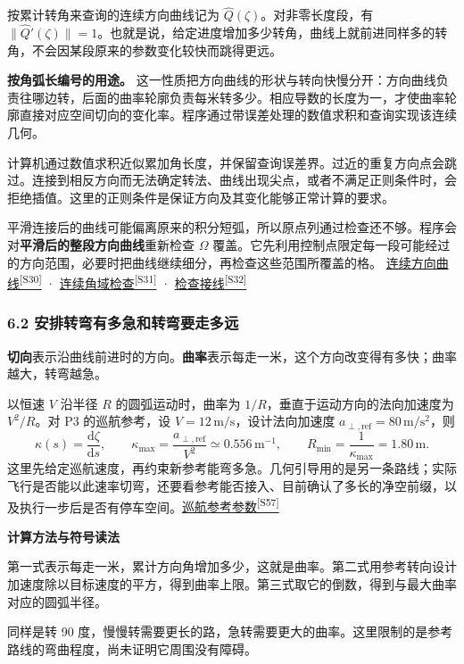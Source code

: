 \documentclass[12pt,a4paper]{article}
\numberwithin{equation}{topic}
\newcommand{\sourceref}[2]{\hyperlink{source-#1}{#2\textsuperscript{[#1]}}}
\begin{document}
按累计转角来查询的连续方向曲线记为 \(\widehat Q(\zeta)\)。对非零长度段，有 \(\|\widehat Q'(\zeta)\|=1\)。也就是说，给定进度增加多少转角，曲线上就前进同样多的转角，不会因某段原来的参数变化较快而跳得更远。

\textbf{按角弧长编号的用途。} 这一性质把方向曲线的形状与转向快慢分开：方向曲线负责往哪边转，后面的曲率轮廓负责每米转多少。相应导数的长度为一，才使曲率轮廓直接对应空间切向的变化率。程序通过带误差处理的数值求积和查询实现该连续几何。

计算机通过数值求积近似累加角长度，并保留查询误差界。过近的重复方向点会跳过。连接到相反方向而无法确定转法、曲线出现尖点，或者不满足正则条件时，会拒绝插值。这里的正则条件是保证方向及其变化能够正常计算的要求。

平滑连接后的曲线可能偏离原来的积分短弧，所以原点列通过检查还不够。程序会对\textbf{平滑后的整段方向曲线}重新检查 \(\Omega\) 覆盖。它先利用控制点限定每一段可能经过的方向范围，必要时把曲线继续细分，再检查这些范围所覆盖的格。 \sourceref{S30}{连续方向曲线} · \sourceref{S31}{连续角域检查} · \sourceref{S32}{检查接线}

\subsubsection*{6.2 安排转弯有多急和转弯要走多远}

\textbf{切向}表示沿曲线前进时的方向。\textbf{曲率}表示每走一米，这个方向改变得有多快；曲率越大，转弯越急。

以恒速 \(V\) 沿半径 \(R\) 的圆弧运动时，曲率为 \(1/R\)，垂直于运动方向的法向加速度为 \(V^2/R\)。对 P3 的巡航参考，设 \(V=12\,\mathrm{m/s}\)，设计法向加速度 \(a_{\perp,\mathrm{ref}}=80\,\mathrm{m/s^2}\)，则
\begin{equation}
\label{eq:p3-reference-curvature}
\kappa(s)=\frac{\mathrm d\zeta}{\mathrm ds},\qquad
\kappa_{\max}=\frac{a_{\perp,\mathrm{ref}}}{V^2}\simeq0.556\,\mathrm{m^{-1}},\qquad
R_{\min}=\frac{1}{\kappa_{\max}}=1.80\,\mathrm m .
\end{equation}
这里先给定巡航速度，再约束新参考能弯多急。几何引导用的是另一条路线；实际飞行是否能以此速率切弯，还要看参考能否接入、目前确认了多长的净空前缀，以及执行一步后是否有停车空间。\sourceref{S57}{巡航参考参数}

\noindent\textbf{计算方法与符号读法}\par\nobreak
第一式表示每走一米，累计方向角增加多少，这就是曲率。第二式用参考转向设计加速度除以目标速度的平方，得到曲率上限。第三式取它的倒数，得到与最大曲率对应的圆弧半径。

同样是转 90 度，慢慢转需要更长的路，急转需要更大的曲率。这里限制的是参考路线的弯曲程度，尚未证明它周围没有障碍。
\end{document}
